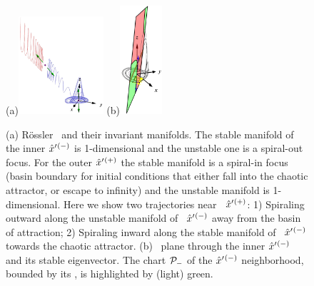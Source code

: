 \documentclass[aip,cha,reprint,
secnumarabic,
nofootinbib, tightenlines,
nobibnotes, showkeys, showpacs,
groupedaddress
]{revtex4-1}
\begin{document}
\begin{figure}
(a)\includegraphics[width=0.28\textwidth]{RoessTrjs2}%
(b)\includegraphics[width=0.14\textwidth,clip=true]{RoessNearEq3}
    \caption{
(a)
R\"ossler \eqva\ and their invariant manifolds. The stable manifold of
the inner {\eqv} ${\hat{x}'}{}^{(-)}$  is 1-dimensional and the unstable one
is a spiral-out focus. For the outer {\eqv} ${\hat{x}'}{}^{(+)}$  the stable
manifold is a spiral-in focus (basin boundary for initial conditions that
either fall into the chaotic attractor, or escape to infinity) and the
unstable manifold is 1-dimensional. Here we show two trajectories near
\eqva\ ${\hat{x}'}{}^{(+)}$: 1) Spiraling outward along the unstable
manifold of \eqva\ ${\hat{x}'}{}^{(-)}$ away from the basin of attraction;
2) Spiraling inward along the stable manifold of \eqva\ ${\hat{x}'}{}^{(-)}$
towards the chaotic attractor.
(b)
\PoincSec\ plane through the inner {\eqv} ${\hat{x}'}{}^{(-)}$ and
its stable eigenvector. The chart ${\cal P}_{-}$ of the ${\hat{x}'}{}^{(-)}$
neighborhood, bounded by its \poincBord, is highlighted by (light) green.
    }
\label{fig:RoessTrjs}
\end{figure}
\end{document}

